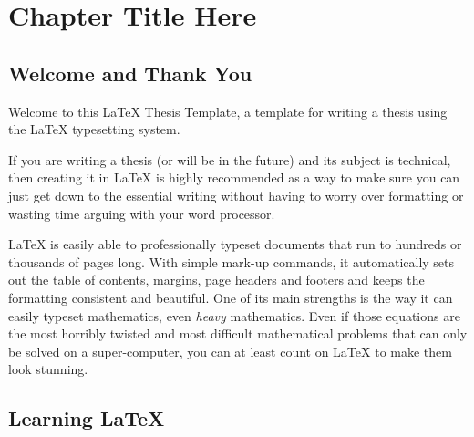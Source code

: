 
\chapter{Chapter Title Here} %

\label{Chapter1} %


\newcommand{\keyword}[1]{\textbf{#1}}
\newcommand{\tabhead}[1]{\textbf{#1}}
\newcommand{\code}[1]{\texttt{#1}}
\newcommand{\file}[1]{\texttt{\bfseries#1}}
\newcommand{\option}[1]{\texttt{\itshape#1}}


\section{Welcome and Thank You}
\label{sec:welcome}
Welcome to this \LaTeX{} Thesis Template, a template for writing a
thesis using the \LaTeX{} typesetting system.

If you are writing a thesis (or will be in the future) and its subject
is technical, then creating it in \LaTeX{} is highly recommended as a
way to make sure you can just get down to the essential writing without
having to worry over formatting or wasting time arguing with your word
processor.

\LaTeX{} is easily able to professionally typeset documents that run to
hundreds or thousands of pages long. With simple mark-up commands, it
automatically sets out the table of contents, margins, page headers and
footers and keeps the formatting consistent and beautiful. One of its
main strengths is the way it can easily typeset mathematics, even
\emph{heavy} mathematics. Even if those equations are the most horribly
twisted and most difficult mathematical problems that can only be solved
on a super-computer, you can at least count on \LaTeX{} to make them
look stunning.


\section{Learning \LaTeX{}}
\label{sec:learning}

